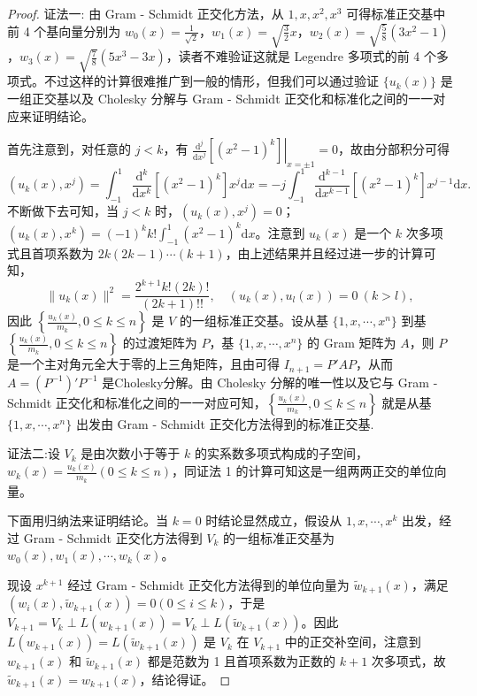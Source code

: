 \documentclass[../../main.tex]{subfiles}%
\begin{document}
\begin{proof}

{\color{blue}证法一:}
由 Gram - Schmidt 正交化方法，从 $1,x,x^2,x^3$ 可得标准正交基中前 4 个基向量分别为 $w_0(x)=\frac{1}{\sqrt{2}}$，$w_1(x)=\sqrt{\frac{3}{2}}x$，$w_2(x)=\sqrt{\frac{5}{8}}(3x^2 - 1)$，$w_3(x)=\sqrt{\frac{7}{8}}(5x^3 - 3x)$，读者不难验证这就是 Legendre 多项式的前 4 个多项式。不过这样的计算很难推广到一般的情形，但我们可以通过验证 $\{u_k(x)\}$ 是一组正交基以及 Cholesky 分解与 Gram - Schmidt 正交化和标准化之间的一一对应来证明结论。

首先注意到，对任意的 $j < k$，有 $\left.\frac{\mathrm{d}^j}{\mathrm{d}x^j}[(x^2 - 1)^k]\right|_{x = \pm1}=0$，故由分部积分可得
\[
(u_k(x),x^j)=\int_{-1}^{1}\frac{\mathrm{d}^k}{\mathrm{d}x^k}[(x^2 - 1)^k]x^j\mathrm{d}x=-j\int_{-1}^{1}\frac{\mathrm{d}^{k - 1}}{\mathrm{d}x^{k - 1}}[(x^2 - 1)^k]x^{j - 1}\mathrm{d}x.
\]
不断做下去可知，当 $j < k$ 时，$(u_k(x),x^j)=0$；$(u_k(x),x^k)=(-1)^kk!\int_{-1}^{1}(x^2 - 1)^k\mathrm{d}x$。注意到 $u_k(x)$ 是一个 $k$ 次多项式且首项系数为 $2k(2k - 1)\cdots(k + 1)$，由上述结果并且经过进一步的计算可知，
\[
\|u_k(x)\|^2=\frac{2^{k + 1}k!(2k)!}{(2k + 1)!!},\quad (u_k(x),u_l(x))=0\ (k > l),
\]
因此 $\left\{\frac{u_k(x)}{m_k},0\leqslant  k\leqslant  n\right\}$ 是 $V$ 的一组标准正交基。设从基 $\{1,x,\cdots,x^n\}$ 到基 $\left\{\frac{u_k(x)}{m_k},0\leqslant  k\leqslant  n\right\}$ 的过渡矩阵为 $P$，基 $\{1,x,\cdots,x^n\}$ 的 Gram 矩阵为 $A$，则 $P$ 是一个主对角元全大于零的上三角矩阵，且由可得 $I_{n + 1}=P'AP$，从而 $A=(P^{-1})'P^{-1}$ 是Cholesky分解。由 Cholesky 分解的唯一性以及它与 Gram - Schmidt 正交化和标准化之间的一一对应可知，$\left\{\frac{u_k(x)}{m_k},0\leqslant  k\leqslant  n\right\}$ 就是从基 $\{1,x,\cdots,x^n\}$ 出发由 Gram - Schmidt 正交化方法得到的标准正交基.

{\color{blue}证法二:}设 $V_k$ 是由次数小于等于 $k$ 的实系数多项式构成的子空间，$w_k(x) = \frac{u_k(x)}{m_k} (0 \leqslant  k \leqslant  n)$，同证法 1 的计算可知这是一组两两正交的单位向量。

下面用归纳法来证明结论。当 $k = 0$ 时结论显然成立，假设从 $1, x, \cdots, x^k$ 出发，经过 Gram - Schmidt 正交化方法得到 $V_k$ 的一组标准正交基为 $w_0(x), w_1(x), \cdots, w_k(x)$。

现设 $x^{k + 1}$ 经过 Gram - Schmidt 正交化方法得到的单位向量为 $\widetilde{w}_{k + 1}(x)$，满足 $(w_i(x), \widetilde{w}_{k + 1}(x)) = 0 (0 \leqslant  i \leqslant  k)$，于是 $V_{k + 1} = V_k \perp L(w_{k + 1}(x)) = V_k \perp L(\widetilde{w}_{k + 1}(x))$。因此 $L(w_{k + 1}(x)) = L(\widetilde{w}_{k + 1}(x))$ 是 $V_k$ 在 $V_{k + 1}$ 中的正交补空间，注意到 $w_{k + 1}(x)$ 和 $\widetilde{w}_{k + 1}(x)$ 都是范数为 1 且首项系数为正数的 $k + 1$ 次多项式，故 $\widetilde{w}_{k + 1}(x) = w_{k + 1}(x)$，结论得证。

\end{proof}
\end{document}
